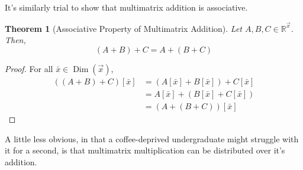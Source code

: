 \documentclass[12pt]{book}
\theoremstyle{definition}
\theoremstyle{plain}
\newtheorem{theorem}{Theorem}[chapter]
\theoremstyle{ppart}
\theoremstyle{case}
\theoremstyle{solution}
\DeclareMathOperator{\Dim}{Dim}
\begin{document}
It's similarly trial to show that multimatrix addition is associative.

\begin{theorem}[Associative Property of Multimatrix Addition]
Let $A, B, C \in \mathbb{R}^{\vec{x}}$. Then,
\[ (A + B) + C = A + (B + C) \]
\end{theorem}
\begin{proof}
For all $\bar{x} \in \Dim(\vec{x})$,
\begin{align*}
\left( (A+B)+C \right)[\bar{x}]
&= (A[\bar{x}]+B[\bar{x}])+C[\bar{x}] \\
&= A[\bar{x}]+(B[\bar{x}]+C[\bar{x}]) \\
&= \left( A+(B+C) \right)[\bar{x}]
\end{align*}
\end{proof}

A little less obvious, in that a coffee-deprived undergraduate might
struggle with it for a second, is that multimatrix multiplication can be
distributed over it's addition.
\end{document}
